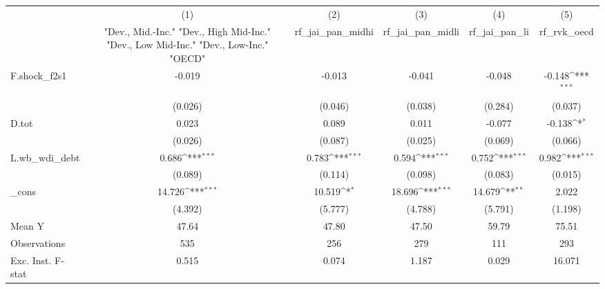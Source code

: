 {
\def\sym#1{\ifmmode^{#1}\else\(^{#1}\)\fi}
\begin{tabular}{l*{5}{c}}
\toprule
            &\multicolumn{1}{c}{(1)}&\multicolumn{1}{c}{(2)}&\multicolumn{1}{c}{(3)}&\multicolumn{1}{c}{(4)}&\multicolumn{1}{c}{(5)}\\
            &\multicolumn{1}{c}{ "Dev., Mid.-Inc." "Dev., High Mid-Inc." "Dev., Low Mid-Inc." "Dev., Low-Inc." "OECD" }&\multicolumn{1}{c}{rf\_jai\_pan\_midhi}&\multicolumn{1}{c}{rf\_jai\_pan\_midli}&\multicolumn{1}{c}{rf\_jai\_pan\_li}&\multicolumn{1}{c}{rf\_rvk\_oecd}\\
\midrule
F.shock\_f2s1&      -0.019         &      -0.013         &      -0.041         &      -0.048         &      -0.148\sym{***}\\
            &     (0.026)         &     (0.046)         &     (0.038)         &     (0.284)         &     (0.037)         \\
\addlinespace
D.tot       &       0.023         &       0.089         &       0.011         &      -0.077         &      -0.138\sym{*}  \\
            &     (0.026)         &     (0.087)         &     (0.025)         &     (0.069)         &     (0.066)         \\
\addlinespace
L.wb\_wdi\_debt&       0.686\sym{***}&       0.783\sym{***}&       0.594\sym{***}&       0.752\sym{***}&       0.982\sym{***}\\
            &     (0.089)         &     (0.114)         &     (0.098)         &     (0.083)         &     (0.015)         \\
\addlinespace
\_cons      &      14.726\sym{***}&      10.519\sym{*}  &      18.696\sym{***}&      14.679\sym{**} &       2.022         \\
            &     (4.392)         &     (5.777)         &     (4.788)         &     (5.791)         &     (1.198)         \\
\midrule
Mean Y      &       47.64         &       47.80         &       47.50         &       59.79         &       75.51         \\
Observations&         535         &         256         &         279         &         111         &         293         \\
Exc. Inst. F-stat&       0.515         &       0.074         &       1.187         &       0.029         &      16.071         \\
\bottomrule
\end{tabular}
}
